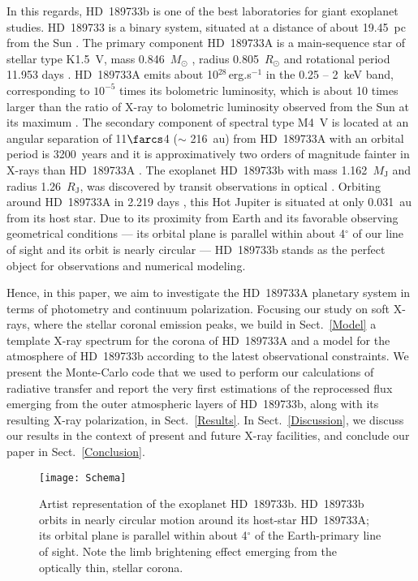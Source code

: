 \documentclass[iop]{emulateapj}
\begin{document}
In this regards, HD~189733b is one of the best laboratories for giant exoplanet studies. HD~189733 is a binary system, situated at a 
distance of about 19.45~pc from the Sun \citep{VanLeeuwen2007}. The primary component HD~189733A is a main-sequence star of stellar type 
K1.5~V, mass 0.846~$M_\odot$ \citep{Kok2013}, radius 0.805~$R_\odot$ \citep{Belle2009,Boyajian2015} and rotational period 11.953 days 
\citep{Henry2008}. HD~189733A emits about 10$^{28~}$erg.s$^{-1}$ in the 0.25 -- 2~keV band, corresponding to $10^{-5}$ times 
its bolometric luminosity, which is about 10 times larger than the ratio of X-ray to bolometric luminosity observed from the Sun at 
its maximum \citep{Poppenhaeger2013}. The secondary component of spectral type M4~V is located at an angular separation of 11$\farcs$4 
($\sim$ 216~au) from HD~189733A with an orbital period is 3200~years \citep{Bakos2006} and it is approximatively two 
orders of magnitude fainter in X-rays than HD~189733A \citep{Poppenhaeger2013}. The exoplanet HD~189733b with mass 1.162~$M_\mathrm{J}$
\citep{Kok2013} and radius 1.26~$R_\mathrm{J}$, was discovered by transit observations in optical \citep{Bouchy2005}. Orbiting around 
HD~189733A in 2.219 days \citep{Triaud2009}, this Hot Jupiter is situated at only 0.031~au from its host star. Due to its proximity 
from Earth and its favorable observing geometrical conditions --- its orbital plane is parallel within about 4$^{\circ}$ of our line of 
sight \citep{Triaud2009} and its orbit is nearly circular \citep{Berdyugina2008} --- HD~189733b stands as the perfect object for 
observations and numerical modeling.

Hence, in this paper, we aim to investigate the HD~189733A planetary system in terms of photometry and continuum polarization. Focusing 
our study on soft X-rays, where the stellar coronal emission peaks, we build in Sect.~\ref{Model} a template X-ray spectrum for the corona 
of HD~189733A and a model for the atmosphere of HD~189733b according to the latest observational constraints. We present the Monte-Carlo code 
that we used to perform our calculations of radiative transfer and report the very first estimations of the reprocessed flux emerging 
from the outer atmospheric layers of HD~189733b, along with its resulting X-ray polarization, in Sect.~\ref{Results}. In Sect.~\ref{Discussion}, 
we discuss our results in the context of present and future X-ray facilities, and conclude our paper in Sect.~\ref{Conclusion}.




\begin{figure}[!t]
  \centering
  \texttt{[image: Schema]} 
  \caption{Artist representation of the exoplanet HD~189733b. HD~189733b
	   orbits in nearly circular motion around its host-star HD~189733A;
	   its orbital plane is parallel within about 4$^{\circ}$ of the 
	   Earth-primary line of sight. Note the limb brightening effect 
	   emerging from the optically thin, stellar corona. }
  \label{Fig:Sketch} 
\end{figure}
\end{document}
